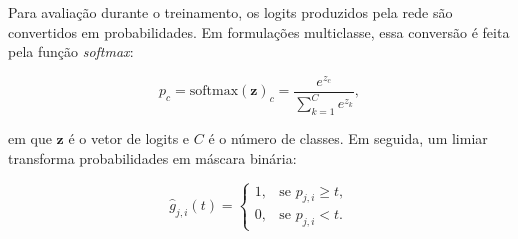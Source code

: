 Para avaliação durante o treinamento, os logits produzidos pela rede são
convertidos em probabilidades. Em formulações multiclasse, essa conversão é feita
pela função \textit{softmax}:

\begin{equation}\label{eq:softmax}
    p_c = \mathrm{softmax}(\mathbf{z})_c =
    \frac{e^{z_c}}{\sum_{k=1}^{C}e^{z_k}},
\end{equation}

em que $\mathbf{z}$ é o vetor de logits e $C$ é o número de classes. Em seguida,
um limiar transforma probabilidades em máscara binária:

\begin{equation}\label{eq:binarizacao-threshold}
    \hat{g}_{j,i}(t)=
    \begin{cases}
        1, & \text{se } p_{j,i}\geq t,\\
        0, & \text{se } p_{j,i}<t.
    \end{cases}
\end{equation}

